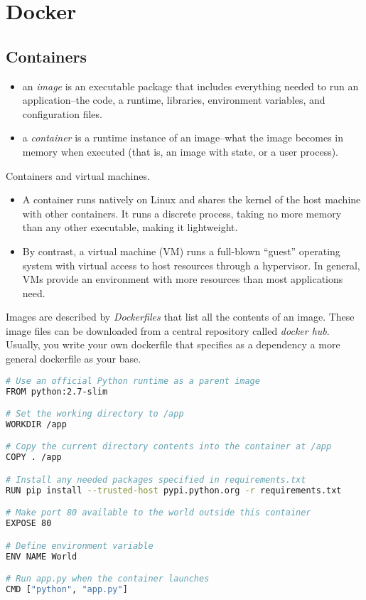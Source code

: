 \section{Docker}

\subsection{Containers}

\begin{itemize}
    \item an \emph{image} is an executable package that includes everything needed to run an application--the code, a runtime, libraries, environment variables, and configuration files.
    \item a \emph{container} is a runtime instance of an image--what the image becomes in memory when executed (that is, an image with state, or a user process).
\end{itemize}


Containers and virtual machines.
\begin{itemize}
    \item A container runs natively on Linux and shares the kernel of the host machine with other containers. It runs a discrete process, taking no more memory than any other executable, making it lightweight.
    \item By contrast, a virtual machine (VM) runs a full-blown “guest” operating system with virtual access to host resources through a hypervisor. In general, VMs provide an environment with more resources than most applications need.
\end{itemize}

Images are described by \emph{Dockerfiles} that list all the contents of an image. These image files can be downloaded from a central repository called \emph{docker hub}.
Usually, you write your own dockerfile that specifies as a dependency a more general dockerfile as your base. 

\begin{lstlisting}[language=bash]
# Use an official Python runtime as a parent image
FROM python:2.7-slim

# Set the working directory to /app
WORKDIR /app

# Copy the current directory contents into the container at /app
COPY . /app

# Install any needed packages specified in requirements.txt
RUN pip install --trusted-host pypi.python.org -r requirements.txt

# Make port 80 available to the world outside this container
EXPOSE 80

# Define environment variable
ENV NAME World

# Run app.py when the container launches
CMD ["python", "app.py"]
\end{lstlisting}

